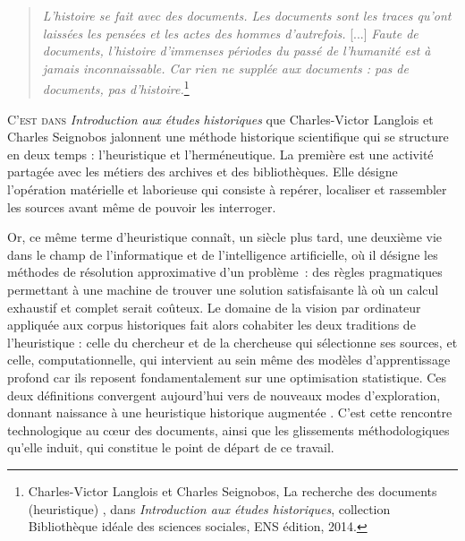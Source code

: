 \begin{quote}
  \textit{L’histoire se fait avec des documents. Les documents sont les traces qu’ont laissées les pensées et les actes des hommes d’autrefois.} [...] \textit{Faute de documents, l’histoire d’immenses périodes du passé de l’humanité est à jamais inconnaissable. Car rien ne supplée aux documents : pas de documents, pas d’histoire.}\footnote{Charles-Victor Langlois et Charles Seignobos, \og La recherche des documents (heuristique) \fg, dans \textit{Introduction aux études historiques}, collection Bibliothèque idéale des sciences sociales, ENS édition, 2014.}
\end{quote}


\lettrine{C}{'est dans} \textit{Introduction aux études historiques} que Charles-Victor Langlois et Charles Seignobos jalonnent une méthode historique scientifique qui se structure en deux temps : l'heuristique et l'herméneutique. La première est une activité partagée avec les métiers des archives et des bibliothèques. Elle désigne l'opération matérielle et laborieuse qui consiste à repérer, localiser et rassembler les sources avant même de pouvoir les interroger.


Or, ce même terme d'\og heuristique \fg{} connaît, un siècle plus tard, une deuxième vie dans le champ de l'informatique et de l'intelligence artificielle, où il désigne les méthodes de résolution approximative d'un problème~: des règles pragmatiques permettant à une machine de trouver une solution satisfaisante là où un calcul exhaustif et complet serait coûteux. Le domaine de la vision par ordinateur appliquée aux corpus historiques fait alors cohabiter les deux traditions de l'heuristique : celle du chercheur et de la chercheuse qui sélectionne ses sources, et celle, computationnelle, qui intervient au sein même des modèles d'apprentissage profond car ils reposent fondamentalement sur une optimisation statistique. Ces deux définitions convergent aujourd'hui vers de nouveaux modes d'exploration, donnant naissance à une heuristique historique \og augmentée \fg. C'est cette rencontre technologique au cœur des documents, ainsi que les glissements méthodologiques qu'elle induit, qui constitue le point de départ de ce travail.

